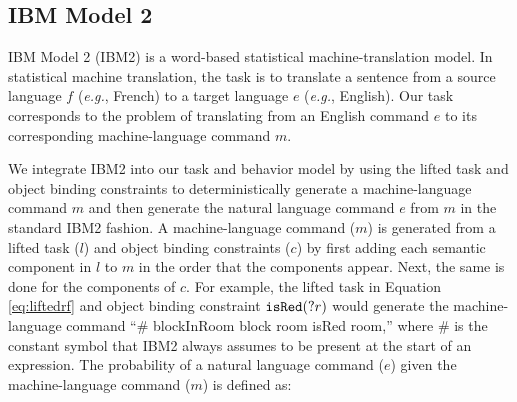 \documentclass[conference]{IEEEtran}
\begin{document}

\subsection{IBM Model 2}

IBM Model 2 (IBM2) \cite{brown90,brown93} is a word-based statistical machine-translation model. In statistical machine translation, the task is to translate a sentence from a source language $f$ (\emph{e.g.}, French) to a target language $e$ (\emph{e.g.}, English). Our task corresponds to the problem of translating from an English command $e$ to its corresponding machine-language command $m$. 

We integrate IBM2 into our task and behavior model by using the lifted task and object binding constraints to deterministically generate a machine-language command $m$ and then generate the natural language command $e$ from $m$ in the standard IBM2 fashion. 
A machine-language command ($m$) is generated from a lifted task ($l$) and object binding constraints ($c$) by first adding each semantic component in $l$
to $m$ in the order that the components appear. Next, the same is done for the components of $c$. For example, the lifted task in Equation \ref{eq:liftedrf} and object binding constraint ${\tt isRed}(?r)$ would generate the machine-language command ``\# blockInRoom block room isRed room,'' where \# is the constant symbol that IBM2 always assumes to be present at the start of an expression. The probability of a natural language command ($e$) given the machine-language command ($m$) is defined as:
\end{document}
